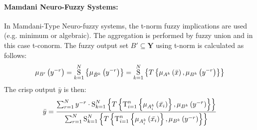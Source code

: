 \paragraph{Mamdani Neuro-Fuzzy Systems:}
In Mamdani-Type Neuro-fuzzy systems, the t-norm fuzzy implications are used (e.g. minimum or algebraic). The aggregation is performed by fuzzy union and in this case t-conorm. The fuzzy output set ${B}'\subseteq \mathbf{Y}$ using t-norm is calculated as follows:
\begin{equation}
    \mu_{{B}'}\left(y^{-r}\right)=\operatornamewithlimits{S}_{k=1}^{N}\left\{\mu_{\bar{B}^{k}}\left(y^{-r}\right)\right\}=\operatornamewithlimits{S}_{k=1}^{N}\left\{ T\left\{ \mu_{A^{k}}\left(\bar{x}\right),\mu_{B^{k}}\left(y^{-r}\right)\right\}\right\}
\end{equation}
The crisp output $\bar{y}$ is then:
\begin{equation}
    \bar{y}=\frac{\sum_{r=1}^{N}y^{-r}\cdot \operatornamewithlimits{S}_{k=1}^{N}\left \{ T\left \{ \operatornamewithlimits{T}_{i=1}^{n}\left \{ \mu_{A_{i}^{k}}\left ( \bar{x_{i}} \right ) \right \},\mu_{B^{k}}\left ( y^{-r} \right ) \right \} \right \}}{\sum_{r=1}^{N}\operatornamewithlimits{S}_{k=1}^{N}\left \{ T\left \{ \operatornamewithlimits{T}_{i=1}^{n}\left \{ \mu_{A_{i}^{k}}\left ( \bar{x_{i}} \right ) \right \},\mu_{B^{k}}\left ( y^{-r} \right ) \right \} \right \}}
\end{equation}
